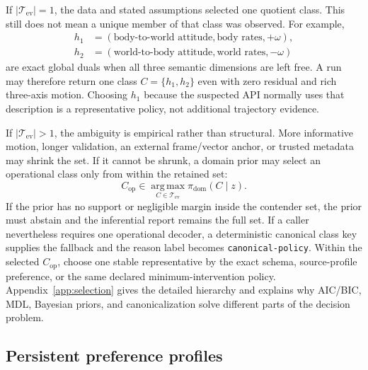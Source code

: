 \documentclass[11pt]{article}
\newcommand{\argmax}{\operatorname*{arg\,max}}
\begin{document}
    If $|\mathcal T_{\mathrm{ev}}|=1$, the data and stated assumptions selected one quotient
    class. This still does not mean a unique member of that class was observed. For
    example,
    \begin{align}
        h_1&=(\text{body-to-world attitude},\text{body rates},+\omega),\\
        h_2&=(\text{world-to-body attitude},\text{world rates},-\omega)
    \end{align}
    are exact global duals when all three semantic dimensions are left free. A run may
    therefore return one class $C=\{h_1,h_2\}$ even with zero residual and rich three-axis
    motion. Choosing $h_1$ because the suspected API normally uses that description is a
    representative policy, not additional trajectory evidence.

    If $|\mathcal T_{\mathrm{ev}}|>1$, the ambiguity is empirical rather than structural.
    More informative motion, longer validation, an external frame/vector anchor, or trusted
    metadata may shrink the set. If it cannot be shrunk, a domain prior may select an
    operational class only from within the retained set:
    \begin{equation}
        C_{\mathrm{op}}
        \in\argmax_{C\in\mathcal T_{\mathrm{ev}}}
        \pi_{\mathrm{dom}}(C\mid z).
        \label{eq:focused-prior-tiebreak}
    \end{equation}
    If the prior has no support or negligible margin inside the contender set, the prior
    must abstain and the inferential report remains the full set. If a caller nevertheless
    requires one operational decoder, a deterministic canonical class key supplies the
    fallback and the reason label becomes \texttt{canonical-policy}. Within the selected
    $C_{\mathrm{op}}$, choose one stable representative by the exact schema,
    source-profile preference, or the same declared minimum-intervention policy. Appendix~\ref{app:selection} gives the detailed hierarchy and
    explains why AIC/BIC, MDL, Bayesian priors, and canonicalization solve different parts of
    the decision problem.

    \subsection{Persistent preference profiles}
    \label{sec:preference-profile}
\end{document}
